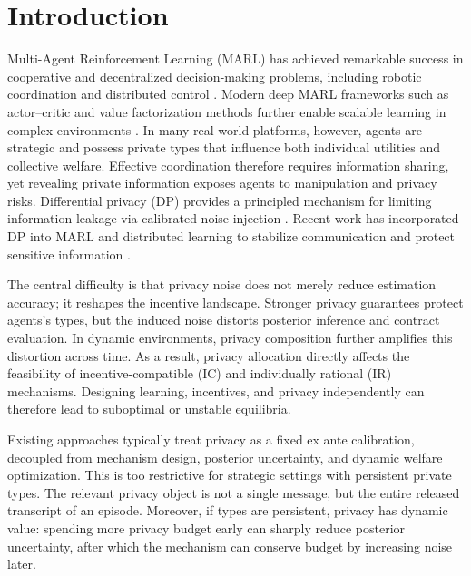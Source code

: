 \documentclass{article}
\begin{document}
\section{Introduction}
\label{sec:intro}
 
Multi-Agent Reinforcement Learning (MARL) has achieved remarkable success in cooperative and decentralized decision-making problems, including robotic coordination and distributed control \citep{busoniu2008comprehensive,cao2012overview}. Modern deep MARL frameworks such as actor--critic and value factorization methods further enable scalable learning in complex environments \citep{lowe2017multi,rashid2020monotonic,zhou2023centralized}. In many real-world platforms, however, agents are strategic and possess private types that influence both individual utilities and collective welfare. Effective coordination therefore requires information sharing, yet revealing private information exposes agents to manipulation and privacy risks. Differential privacy (DP) provides a principled mechanism for limiting information leakage via calibrated noise injection \citep{dwork2025differentially}. Recent work has incorporated DP into MARL and distributed learning to stabilize communication and protect sensitive information \citep{zhao2023dpmac,ahmed2024privacy,chen2023differential}.

The central difficulty is that privacy noise does not merely reduce estimation accuracy; it reshapes the incentive landscape. Stronger privacy guarantees protect agents's types, but the induced noise distorts posterior inference and contract evaluation. In dynamic environments, privacy composition further amplifies this distortion across time. As a result, privacy allocation directly affects the feasibility of incentive-compatible (IC) and individually rational (IR) mechanisms. Designing learning, incentives, and privacy independently can therefore lead to suboptimal or unstable equilibria.

Existing approaches typically treat privacy as a fixed ex ante calibration, decoupled from mechanism design, posterior uncertainty, and dynamic welfare optimization. This is too restrictive for strategic settings with persistent private types. The relevant privacy object is not a single message, but the entire released transcript of an episode. Moreover, if types are persistent, privacy has dynamic value: spending more privacy budget early can sharply reduce posterior uncertainty, after which the mechanism can conserve budget by increasing noise later.
\end{document}
